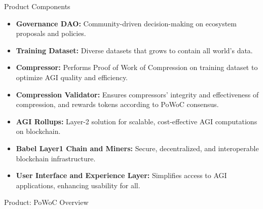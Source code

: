 \documentclass{beamer}
\begin{document}
\begin{frame}{Product Components}
    \begin{itemize}
        \item \textbf{Governance DAO:} Community-driven decision-making on ecosystem proposals and policies.
        \item \textbf{Training Dataset:} Diverse datasets that grows to contain all world's data.
        \item \textbf{Compressor:} Performs Proof of Work of Compression on training dataset to optimize AGI quality and efficiency.
        \item \textbf{Compression Validator:} Ensures compressors' integrity and effectiveness of compression, and rewards tokens according to PoWoC consensus. 
        \item \textbf{AGI Rollups:} Layer-2 solution for scalable, cost-effective AGI computations on blockchain.
        \item \textbf{Babel Layer1 Chain and Miners:} Secure, decentralized, and interoperable blockchain infrastructure.
        \item \textbf{User Interface and Experience Layer:} Simplifies access to AGI applications, enhancing usability for all.
    \end{itemize}
\end{frame}






\begin{frame}{Product: PoWoC Overview}
    \begin{center}
    \end{center}
\end{frame}
\end{document}
